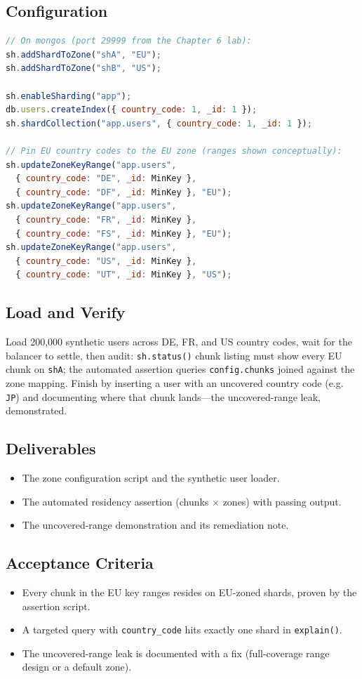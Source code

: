 \subsection{Configuration}
\begin{lstlisting}[language=JavaScript, caption={Zone sharding for EU/US residency.}]
// On mongos (port 29999 from the Chapter 6 lab):
sh.addShardToZone("shA", "EU");
sh.addShardToZone("shB", "US");

sh.enableSharding("app");
db.users.createIndex({ country_code: 1, _id: 1 });
sh.shardCollection("app.users", { country_code: 1, _id: 1 });

// Pin EU country codes to the EU zone (ranges shown conceptually):
sh.updateZoneKeyRange("app.users",
  { country_code: "DE", _id: MinKey },
  { country_code: "DF", _id: MinKey }, "EU");
sh.updateZoneKeyRange("app.users",
  { country_code: "FR", _id: MinKey },
  { country_code: "FS", _id: MinKey }, "EU");
sh.updateZoneKeyRange("app.users",
  { country_code: "US", _id: MinKey },
  { country_code: "UT", _id: MinKey }, "US");
\end{lstlisting}

\subsection{Load and Verify}
Load 200,000 synthetic users across DE, FR, and US country codes, wait for the balancer to settle, then audit: \texttt{sh.status()} chunk listing must show every EU chunk on \texttt{shA}; the automated assertion queries \texttt{config.chunks} joined against the zone mapping. Finish by inserting a user with an uncovered country code (e.g. \texttt{JP}) and documenting where that chunk lands---the uncovered-range leak, demonstrated.

\subsection*{Deliverables}
\begin{itemize}
    \item The zone configuration script and the synthetic user loader.
    \item The automated residency assertion (chunks $\times$ zones) with passing output.
    \item The uncovered-range demonstration and its remediation note.
\end{itemize}

\subsection*{Acceptance Criteria}
\begin{itemize}
    \item Every chunk in the EU key ranges resides on EU-zoned shards, proven by the assertion script.
    \item A targeted query with \texttt{country\_code} hits exactly one shard in \texttt{explain()}.
    \item The uncovered-range leak is documented with a fix (full-coverage range design or a default zone).
\end{itemize}

